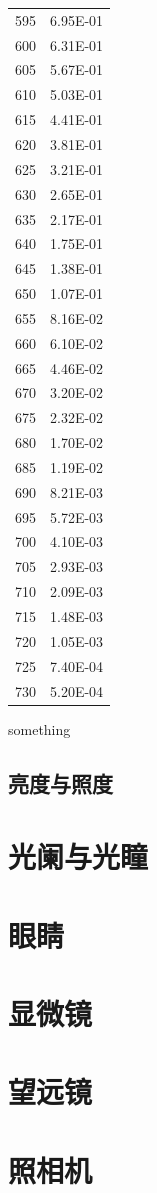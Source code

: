 \begin{table}[]
\begin{supertabular}{cc}
595 & 6.95E-01 \\
600 & 6.31E-01 \\
605 & 5.67E-01 \\
610 & 5.03E-01 \\
615 & 4.41E-01 \\
620 & 3.81E-01 \\
625 & 3.21E-01 \\
630 & 2.65E-01 \\
635 & 2.17E-01 \\
640 & 1.75E-01 \\
645 & 1.38E-01 \\
650 & 1.07E-01 \\
655 & 8.16E-02 \\
660 & 6.10E-02 \\
665 & 4.46E-02 \\
670 & 3.20E-02 \\
675 & 2.32E-02 \\
680 & 1.70E-02 \\
685 & 1.19E-02 \\
690 & 8.21E-03 \\
695 & 5.72E-03 \\
700 & 4.10E-03 \\
705 & 2.93E-03 \\
710 & 2.09E-03 \\
715 & 1.48E-03 \\
720 & 1.05E-03 \\
725 & 7.40E-04 \\
730 & 5.20E-04 \\
\end{supertabular}
\end{table}

something
\subsection{亮度与照度}



\section{光阑与光瞳}

\section{眼睛}

\section{显微镜}

\section{望远镜}

\section{照相机}